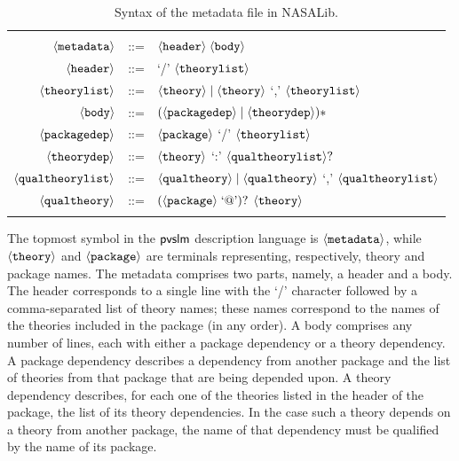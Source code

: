 \begin{table}
  \centering
  \begin{tabular}{r c p{8cm}}
    \hline \\
    $\langle{\texttt{metadata}}\rangle$ & ::= & $\langle{\texttt{header}}\rangle \; \langle{\texttt{body}}\rangle$ \\
    $\langle{\texttt{header}}\rangle$ & ::= & `/' $\langle{\texttt{theorylist}}\rangle$ \\
    $\langle{\texttt{theorylist}}\rangle$ & ::= & $\langle{\texttt{theory}}\rangle \mid \langle{\texttt{theory}}\rangle$ `,' $\langle{\texttt{theorylist}}\rangle$ \\
    $\langle{\texttt{body}}\rangle$ & ::= & $(\langle{\texttt{packagedep}}\rangle \mid \langle{\texttt{theorydep}}\rangle)*$ \\
    $\langle{\texttt{packagedep}}\rangle$ & ::= & $\langle{\texttt{package}}\rangle$ `/' $\langle{\texttt{theorylist}}\rangle$ \\
    $\langle{\texttt{theorydep}}\rangle$ & ::= & $\langle{\texttt{theory}}\rangle$ `:' $\langle{\texttt{qualtheorylist}}\rangle ?$ \\
    $\langle{\texttt{qualtheorylist}}\rangle$ & ::= & $\langle{\texttt{qualtheory}}\rangle \mid \langle{\texttt{qualtheory}}\rangle$ `,' $\langle{\texttt{qualtheorylist}}\rangle$ \\
    $\langle{\texttt{qualtheory}}\rangle$ & ::= & $(\langle{\texttt{package}}\rangle\; \text{`@'})?$ $\langle{\texttt{theory}}\rangle$ \\
    \\
    \hline
  \end{tabular}
  \caption{Syntax of the  metadata file in NASALib.}
  \label{tab.bnf}
\end{table}

The topmost symbol in the $\textsf{pvslm}$ description language is
$\langle{\texttt{metadata}}\rangle$, while $\langle{\texttt{theory}}\rangle$ and
$\langle{\texttt{package}}\rangle$ are terminals representing, respectively,
theory and package names. The metadata comprises two parts, namely, a
header and a body. The header corresponds to a single line with the
`/' character followed by a comma-separated list of theory names;
these names correspond to the names of the theories included in the
package (in any order). A body comprises any number of lines, each
with either a package dependency or a theory dependency. A package
dependency describes a dependency from another package and the list of
theories from that package that are being depended upon. A theory
dependency describes, for each one of the theories listed in the
header of the package, the list of its theory dependencies. In the
case such a theory depends on a theory from another package, the name
of that dependency must be qualified by the name of its package.

